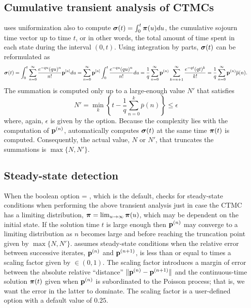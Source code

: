 \subsection{Cumulative transient analysis of CTMCs}\label{SEC:cumul-trans-anal-CTMC}
{\smart} uses uniformization also to compute $\mbox{\boldmath{${\sigma}$}}(t) = \int_0^t
\mbox{\boldmath{${\pi}$}}(u) du$, the cumulative sojourn time vector up to time $t$, or in other words,
the total amount of time spent in each state during the interval $(0,t)$.
Using integration by parts, $\mbox{\boldmath{${\sigma}$}}(t)$ can be reformulated as
$$
  \mbox{\boldmath{${\sigma}$}}(t)
  = \int_{0}^{t}
    \sum_{n=0}^{\infty} \frac{e^{-q u} (q u)^n}{n!} \mathbf{p}^{[n]} d u
  = \sum_{n=0}^{\infty} \mathbf{p}^{[n]}
    \int_{0}^{t} \frac{e^{-q u} (q u)^n}{n!} d u
  = \frac{1}{q} \sum_{n=0}^{\infty} \mathbf{p}^{(n)} \sum_{k=n+1}^{\infty}
  \frac{e^{-q t} (q t)^k}{k!} =
  \frac{1}{q} \sum_{n=0}^{\infty} \mathbf{p}^{(n)} \overline{p}(n).
$$
The summation is computed only up to a large-enough value $N'$ that satisfies
\[
  N' = \min_{k}\left\{t - \frac{1}{q} \sum_{n=0}^{k} \overline{p}(n) \right\} \leq \epsilon
\]
where, again, $\epsilon$ is given by the
 option.
Because the complexity lies with the computation of $\mathbf{p}^{(n)}$,
{\smart} automatically computes $\mbox{\boldmath{${\sigma}$}}(t)$ at the same time $\mbox{\boldmath{${\pi}$}}(t)$
is computed.  Consequently, the actual value, $N$ or $N'$, that truncates
the summations is $\max\{N, N'\}$.

\subsection{Steady-state detection}
When the boolean option  = ,
which is the default, {\smart} checks for steady-state conditions when performing
the above transient analysis just in case the CTMC has a limiting distribution,
$\mbox{\boldmath{${\pi}$}}=\lim_{u\to\infty} \mbox{\boldmath{${\pi}$}}(u)$, which may be dependent on the initial state.
If the solution time $t$ is large enough then $\mathbf{p}^{(n)}$ may converge to a limiting distribution
as $n$ becomes large and before reaching the truncation point given by $\max\{N, N'\}$.
{\smart} assumes steady-state conditions when the relative error between successive iterates,
$\mathbf{p}^{(n)}$ and $\mathbf{p}^{(n+1)}$, is less than or equal to  times a
scaling factor given by  $\in(0, 1)$.
The scaling factor introduces a margin of error between the
absolute relative ``distance'' $\|\mathbf{p}^{(n)}-\mathbf{p}^{(n+1)}\|$ and
the continuous-time solution $\mbox{\boldmath{${\pi}$}}(t)$ given when $\mathbf{p}^{(n)}$ is subordinated
to the Poisson process; that is, we want the error in the latter to dominate.
The scaling factor 
is a user-defined option with a default value of $0.25$.

